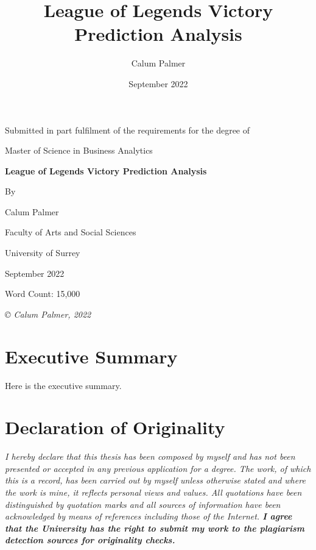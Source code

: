 \documentclass[12pt,a4 paper]{report}
\title{League of Legends Victory Prediction Analysis}
\author{Calum Palmer}
\date{September 2022}
\begin{document}
    \begin{titlepage}
    \centering
        {\large Submitted in part fulfilment of the requirements for the degree of}

    \vspace{0.25cm}
        {\large Master of Science in Business Analytics}

    \vspace{2cm}
        {\huge\bfseries League of Legends Victory Prediction Analysis}

    \vspace{1.5cm}
        {By}

    \vspace{0.5cm}
        {\Large Calum Palmer}

    \vspace{5cm}
        {\large Faculty of Arts and Social Sciences}

    \vspace{0.5cm}
        {\large University of Surrey}

    \vspace{1cm}
        {\large September 2022}

    \vspace{1.5cm}
        {\large Word Count: 15,000}

    \vfill
        {\itshape © Calum Palmer, 2022}

    \end{titlepage}

    \setcounter{page}{2}

    \section*{Executive Summary}\label{sec:executive summary}
    Here is the executive summary.

    \newpage

    \section*{Declaration of Originality}\label{sec:declaration of originality}

    \emph{I hereby declare that this thesis has been composed by myself and has not been
    presented or accepted in any previous application for a degree. The work, of which
    this is a record, has been carried out by myself unless otherwise stated and where
    the work is mine, it reflects personal views and values. All quotations have been
    distinguished by quotation marks and all sources of information have been
    acknowledged by means of references including those of the Internet.
    \textbf{I agree that the University has the right to submit my work to the plagiarism
    detection sources for originality checks.}}
\end{document}
